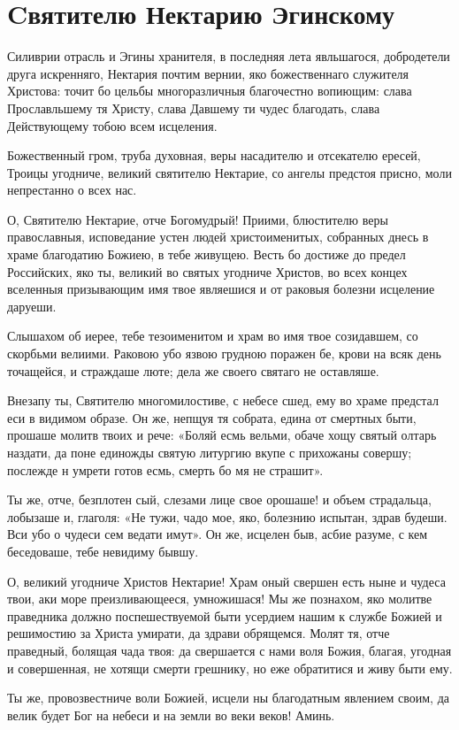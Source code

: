 \section{Cвятителю Нектарию Эгинскому}\begin{mymulticols}


Силиврии отрасль и Эгины хранителя, в последняя лета явльшагося, добродетели друга искренняго, Нектария почтим вернии, яко божественнаго служителя Христова: точит бо цельбы многоразличныя благочестно вопиющим: слава Прославльшему тя Христу, слава Давшему ти чудес благодать, слава Действующему тобою всем исцеления.


Божественный гром, труба духовная, веры насадителю и отсекателю ересей, Троицы угодниче, великий святителю Нектарие, со ангелы предстоя присно, моли непрестанно о всех нас.


О, Святителю Нектарие, отче Богомудрый! Приими, блюстителю веры православныя, исповедание устен людей христоименитых, собранных днесь в храме благодатию Божиею, в тебе живущею. Весть бо достиже до предел Российских, яко ты, великий во святых угодниче Христов, во всех концех вселенныя призывающим имя твое являешися и от раковыя болезни исцеление даруеши.

Слышахом об иерее, тебе тезоименитом и храм во имя твое созидавшем, со скорбьми велиими. Раковою убо язвою грудною поражен бе, крови на всяк день точащейся, и страждаше люте; дела же своего святаго не оставляше.

Внезапу ты, Святителю многомилостиве, с небесе сшед, ему во храме предстал еси в видимом образе. Он же, непщуя тя собрата, едина от смертных быти, прошаше молитв твоих и рече: «Боляй есмь вельми, обаче хощу святый олтарь наздати, да поне единожды святую литургию вкупе с прихожаны совершу; послежде н умрети готов есмь, смерть бо мя не страшит».

Ты же, отче, безплотен сый, слезами лице свое орошаше! и объем страдальца, лобызаше и, глаголя: «Не тужи, чадо мое, яко, болезнию испытан, здрав будеши. Вси убо о чудеси сем ведати имут». Он же, исцелен быв, асбие разуме, с кем беседоваше, тебе невидиму бывшу.

О, великий угодниче Христов Нектарие! Храм оный свершен есть ныне и чудеса твои, аки море преизливающееся, умножишася! Мы же познахом, яко молитве праведника должно поспешествуемой быти усердием нашим к службе Божией и решимостию за Христа умирати, да здрави обрящемся. Молят тя, отче праведный, болящая чада твоя: да свершается с нами воля Божия, благая, угодная и совершенная, не хотящи смерти грешнику, но еже обратитися и живу быти ему.

Ты же, провозвестниче воли Божией, исцели ны благодатным явлением своим, да велик будет Бог на небеси и на земли во веки веков! Аминь.

\end{mymulticols}

